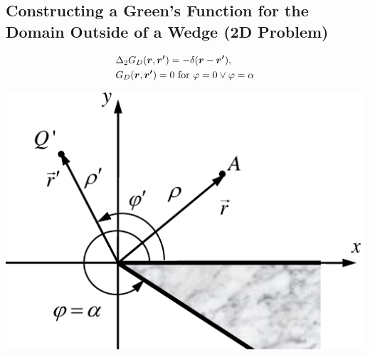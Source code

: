 \subsection{Constructing a Green's Function for the Domain Outside of a Wedge (2D Problem)}
\begin{align*}
  &\Delta_{2}G_{D}(\boldsymbol{r}, \boldsymbol{r'}) = - \delta (\boldsymbol{r} - \boldsymbol{r'}),\\
  &G_{D}(\boldsymbol{r}, \boldsymbol{r'}) = 0\text{ for } \varphi=0 \lor \varphi=\alpha
\end{align*}
\begin{center}
  \includegraphics[width=.3\paperheight]{content/caem/pictures/conducting_wedge.png}
\end{center}
